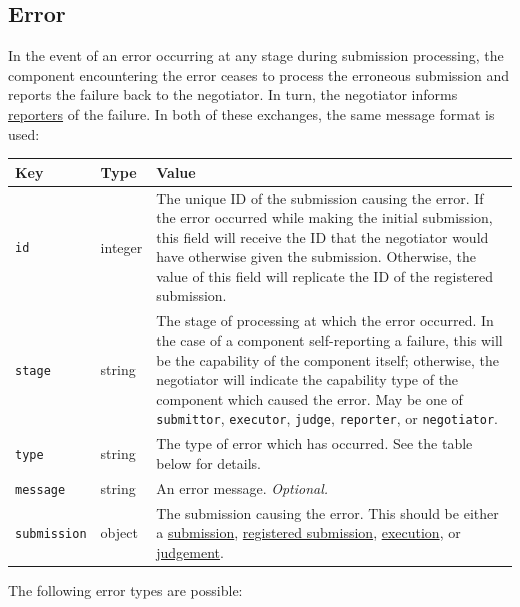 \documentclass[11pt,letterpaper]{article}
\begin{document}
\subsection{Error}
\label{formats-error}

In the event of an error occurring at any stage during submission processing,
the component encountering the error ceases to process the erroneous submission
and reports the failure back to the negotiator. In turn, the negotiator informs
\hyperref[design-reporter]{reporters} of the failure. In both of these
exchanges, the same message format is used:

\begin{tabulary}{\textwidth}{ | l | l | L | }
    \hline
    \textbf{Key} & \textbf{Type} & \textbf{Value} \\
    \hline
    \texttt{id} & integer & The unique ID of the submission causing the error.
        If the error occurred while making the initial submission, this field
        will receive the ID that the negotiator would have otherwise given the
        submission. Otherwise, the value of this field will replicate the ID of
        the registered submission. \\
    \hline
    \texttt{stage} & string & The stage of processing at which the error
        occurred. In the case of a component self-reporting a failure, this
        will be the capability of the component itself; otherwise, the
        negotiator will indicate the capability type of the component which
        caused the error.
        \newline
        \newline
        May be one of \texttt{submittor}, \texttt{executor}, \texttt{judge},
        \texttt{reporter}, or \texttt{negotiator}. \\
    \hline
    \texttt{type} & string & The type of error which has occurred. See the
        table below for details. \\
    \hline
    \texttt{message} & string & An error message. \emph{Optional.} \\
    \hline
    \texttt{submission} & object & The submission causing the error. This
        should be either a \hyperref[formats-sub]{submission},
        \hyperref[formats-reg-sub]{registered submission},
        \hyperref[formats-exec]{execution}, or
        \hyperref[formats-judge]{judgement}. \\
    \hline
\end{tabulary}

The following error types are possible:
\end{document}
